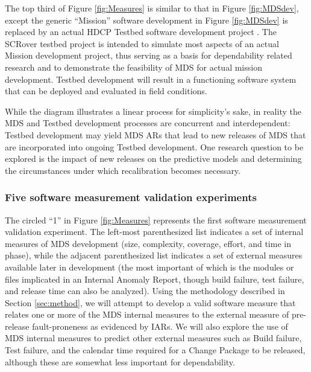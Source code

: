 The top third of Figure \ref{fig:Measures} is similar to that in Figure
\ref{fig:MDSdev}, except the generic ``Mission'' software development in
Figure \ref{fig:MDSdev} is replaced by an actual HDCP Testbed software
development project \cite{Meyer02}.  The SCRover testbed project is intended to
simulate most aspects of an actual Mission development project, thus
serving as a basis for dependability related research and to demonstrate
the feasibility of MDS for actual mission development.  Testbed development
will result in a functioning software system that can be deployed and
evaluated in field conditions.

While the diagram illustrates a linear process for simplicity's sake, in
reality the MDS and Testbed development processes are concurrent and
interdependent: Testbed development may yield MDS ARs that lead to new
releases of MDS that are incorporated into ongoing Testbed development. One 
research question to be explored is the impact of new releases on the
predictive models and determining the circumstances under which
recalibration becomes necessary.

\subsubsection{Five software measurement validation experiments}

The circled ``1'' in Figure \ref{fig:Measures} represents
the first software measurement validation experiment.  The left-most
parenthesized list indicates a set of internal measures of MDS development
(size, complexity, coverage, effort, and time in phase), while the adjacent
parenthesized list indicates a set of external measures available later in
development (the most important of which is the modules or files implicated
in an Internal Anomaly Report, though build failure, test failure, and
release time can also be analyzed).  Using the methodology described in
Section \ref{sec:method}, we will attempt to develop a valid
software measure that relates one or more of the MDS internal measures to
the external measure of pre-release fault-proneness as evidenced by IARs.
We will also explore the use of MDS internal measures to predict other
external measures such as Build failure, Test failure, and the calendar
time required for a Change Package to be released, although these are
somewhat less important for dependability.

